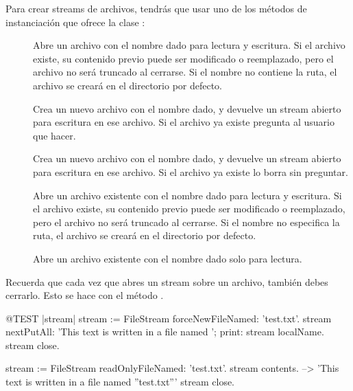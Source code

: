 \documentclass[a4paper,10pt,twoside]{book}
\begin{document}
{Para crear streams de archivos, tendr\'as que usar uno de los 
m\'etodos de instanciaci\'on que ofrece la clase :

\begin{description}

\item[] Abre un archivo con el nombre dado para lectura y escritura.
    Si el archivo existe, su contenido previo puede ser modificado o reemplazado, pero 
    el archivo no ser\'a truncado al cerrarse. Si el nombre no contiene la ruta, el archivo 
    se crear\'a en el directorio por defecto.    

\item[] Crea un nuevo archivo con el nombre dado, y devuelve
    un stream abierto para escritura en ese archivo. Si el archivo ya existe
    pregunta al usuario que hacer.

\item[] Crea un nuevo archivo con el nombre dado, y devuelve
    un stream abierto para escritura en ese archivo. Si el archivo ya existe lo borra 
    sin preguntar.

\item[] Abre un archivo existente con el nombre dado para 
    lectura y escritura. Si el archivo existe, su contenido previo puede ser
    modificado o reemplazado, pero el archivo no ser\'a truncado al cerrarse.
    Si el nombre no especifica la ruta, el archivo se crear\'a en el directorio por defecto.

\item[] Abre un archivo existente con el nombre dado solo para lectura.

\end{description}

Recuerda que cada vez que abres un stream sobre un archivo, tambi\'en debes cerrarlo. 
Esto se hace con el m\'etodo .

\begin{code}{@TEST |stream|}
stream := FileStream forceNewFileNamed: 'test.txt'.
stream
    nextPutAll: 'This text is written in a file named ';
    print: stream localName.
stream close.

stream := FileStream readOnlyFileNamed: 'test.txt'.
stream contents. --> 'This text is written in a file named ''test.txt'''
stream close.
\end{code}

}
\end{document}
